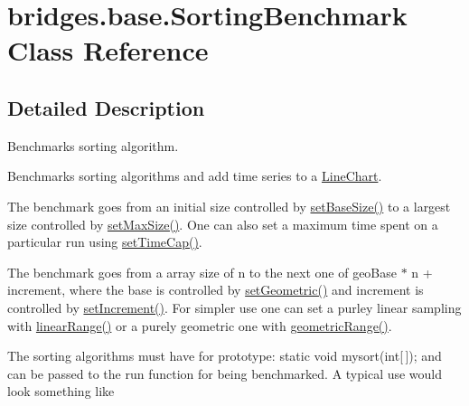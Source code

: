 \hypertarget{classbridges_1_1base_1_1_sorting_benchmark}{}\section{bridges.\+base.\+Sorting\+Benchmark Class Reference}
\label{classbridges_1_1base_1_1_sorting_benchmark}


\subsection{Detailed Description}
Benchmarks sorting algorithm. 

Benchmarks sorting algorithms and add time series to a \mbox{\hyperlink{classbridges_1_1base_1_1_line_chart}{Line\+Chart}}.

The benchmark goes from an initial size controlled by \mbox{\hyperlink{classbridges_1_1base_1_1_sorting_benchmark_a00a718fd919a43355cd343c6bd9d67c4}{set\+Base\+Size()}} to a largest size controlled by \mbox{\hyperlink{classbridges_1_1base_1_1_sorting_benchmark_a7a390c4820afb92d74ef8f023a6cc227}{set\+Max\+Size()}}. One can also set a maximum time spent on a particular run using \mbox{\hyperlink{classbridges_1_1base_1_1_sorting_benchmark_a52b13910224cfafea16f7f3979a77592}{set\+Time\+Cap()}}.

The benchmark goes from a array size of n to the next one of geo\+Base $\ast$ n + increment, where the base is controlled by \mbox{\hyperlink{classbridges_1_1base_1_1_sorting_benchmark_ac85461710590f4baeea7d7b72da3d66f}{set\+Geometric()}} and increment is controlled by \mbox{\hyperlink{classbridges_1_1base_1_1_sorting_benchmark_aed0a9db639ec08c6ae1b5b70a1662809}{set\+Increment()}}. For simpler use one can set a purley linear sampling with \mbox{\hyperlink{classbridges_1_1base_1_1_sorting_benchmark_a2f412cbff4619ce2984a5c57ec5104e6}{linear\+Range()}} or a purely geometric one with \mbox{\hyperlink{classbridges_1_1base_1_1_sorting_benchmark_afd0eb0b328cf0ee12861004445995530}{geometric\+Range()}}.

The sorting algorithms must have for prototype\+: static void mysort(int\mbox{[}$\,$\mbox{]}); and can be passed to the run function for being benchmarked. A typical use would look something like


\begin{DoxyCode}{0}
\end{DoxyCode}


